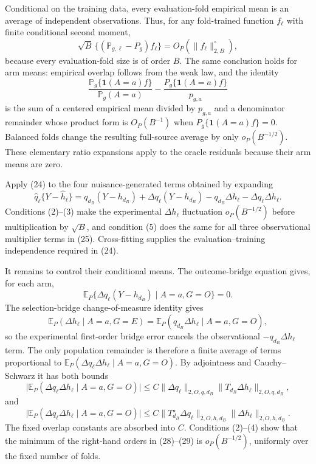 Conditional on the training data, every evaluation-fold empirical mean is an average of independent observations.  Thus, for any fold-trained function \(f_\ell\) with finite conditional second moment,
\[
 \sqrt B\,\{(\mathbb P_{g,\ell}-P_g)f_\ell\}
 =O_P(\|f_\ell\|_{2,B}^{\circ}),                                 \tag{24}
\]
because every evaluation-fold size is of order \(B\).  The same conclusion holds for arm means: empirical overlap follows from the weak law, and the identity
\[
 \frac{\mathbb P_g\{\mathbf1(A=a)f\}}{\mathbb P_g(A=a)}
 -\frac{P_g\{\mathbf1(A=a)f\}}{p_{g,a}}
\]
is the sum of a centered empirical mean divided by \(p_{g,a}\) and a denominator remainder whose product form is \(O_P(B^{-1})\) when \(P_g\{\mathbf1(A=a)f\}=0\).  Balanced folds change the resulting full-source average by only \(o_P(B^{-1/2})\).  These elementary ratio expansions apply to the oracle residuals because their arm means are zero.

Apply (24) to the four nuisance-generated terms obtained by expanding
\[
 \widehat q_\ell\{Y-\widehat h_\ell\}
 =q_{d_B}(Y-h_{d_B})
  +\Delta q_\ell(Y-h_{d_B})
  -q_{d_B}\Delta h_\ell
  -\Delta q_\ell\Delta h_\ell.                                  \tag{25}
\]
Conditions (2)--(3) make the experimental \(\Delta h_\ell\) fluctuation \(o_P(B^{-1/2})\) before multiplication by \(\sqrt B\), and condition (5) does the same for all three observational multiplier terms in (25).  Cross-fitting supplies the evaluation--training independence required in (24).

It remains to control their conditional means.  The outcome-bridge equation gives, for each arm,
\[
 \mathbb E_P\{\Delta q_\ell(Y-h_{d_B})\mid A=a,G=O\}=0.          \tag{26}
\]
The selection-bridge change-of-measure identity gives
\[
 \mathbb E_P(\Delta h_\ell\mid A=a,G=E)
 =\mathbb E_P(q_{d_B}\Delta h_\ell\mid A=a,G=O),                 \tag{27}
\]
so the experimental first-order bridge error cancels the observational \(-q_{d_B}\Delta h_\ell\) term.  The only population remainder is therefore a finite average of terms proportional to
\(
 \mathbb E_P(\Delta q_\ell\Delta h_\ell\mid A=a,G=O)
\).
By adjointness and Cauchy--Schwarz it has both bounds
\[
 \bigl|\mathbb E_P(\Delta q_\ell\Delta h_\ell\mid A=a,G=O)\bigr|
 \le C\|\Delta q_\ell\|_{2,O,q,d_B}
       \|T_{d_B}\Delta h_\ell\|_{2,O,q,d_B},                    \tag{28}
\]
and
\[
 \bigl|\mathbb E_P(\Delta q_\ell\Delta h_\ell\mid A=a,G=O)\bigr|
 \le C\|T_{d_B}^{\star}\Delta q_\ell\|_{2,O,h,d_B}
       \|\Delta h_\ell\|_{2,O,h,d_B}.                           \tag{29}
\]
The fixed overlap constants are absorbed into \(C\).  Conditions (2)--(4) show that the minimum of the right-hand orders in (28)--(29) is \(o_P(B^{-1/2})\), uniformly over the fixed number of folds.

